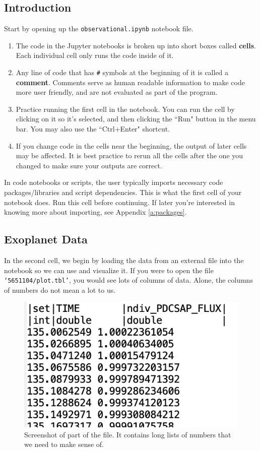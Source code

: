 \documentclass[14pt]{article}
\begin{document}
\subsection*{Introduction}
Start by opening up the \texttt{observational.ipynb} notebook file.
    \begin{enumerate}
    \item The code in the Jupyter notebooks is broken up into short boxes called \textbf{cells}. Each individual cell only runs the code inside of it.
    \item Any line of code that has \texttt{\#} symbols at the beginning of it is called a \textbf{comment}. Comments serve as human readable information to make code more user friendly, and are not evaluated as part of the program.
    \item Practice running the first cell in the notebook. You can run the cell by clicking on it so it's selected, and then clicking the ``Run" button in the menu bar. You may also use the ``Ctrl+Enter" shortcut.
    \item If you change code in the cells near the beginning, the output of later cells may be affected. It is best practice to rerun all the cells after the one you changed to make sure your outputs are correct.
    \end{enumerate}
In code notebooks or scripts, the user typically imports necessary code packages/libraries and script dependencies. This is what the first cell of your notebook does. Run this cell before continuing. If later you're interested in knowing more about importing, see Appendix \ref{a:packages}.

\subsection*{Exoplanet Data}
In the second cell, we begin by loading the data from an external file into the notebook so we can use and visualize it. If you were to open the file \texttt{`5651104/plot.tbl'}, you would see lots of columns of data. Alone, the columns of numbers do not mean a lot to us. 

\begin{figure}[hb!]
    \centering
    \includegraphics[width=.275\linewidth]{data_example.png}
    \caption{Screenshot of part of the file. It contains long lists of numbers that we need to make sense of.}
    \label{fig:data_example}
\end{figure}
\end{document}

